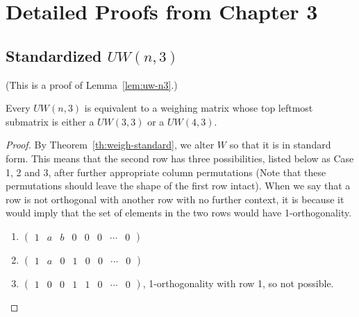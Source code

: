 \chapter[Detailed Proofs from Chapter 3]{Detailed Proofs from Chapter 3}
\label{app:ch3-cases}

\section[Standardized \texorpdfstring{$UW(n,3)$}{UW(n,3)}]{Standardized \texorpdfstring{$UW(n,3)$}{UW(n,3)}}
\label{app:uw-n3}

(This is a proof of Lemma~\ref{lem:uw-n3}.)

\begin{lemma} \label{lem-proof:uw-n3}
 Every $UW(n,3)$ is equivalent to a weighing matrix whose top leftmost submatrix is either a $UW(3,3)$ or a $UW(4,3)$.

\begin{proof}
 By Theorem~\ref{th:weigh-standard}, we alter $W$ so that it is in standard form. This means that the second row has three possibilities, listed below as Case 1, 2 and 3, after further appropriate column permutations (Note that these permutations should leave the shape of the first row intact). When we say that a row is not orthogonal with another row with no further context, it is because it would imply that the set of elements in the two rows would have 1-orthogonality.

   \begin{enumerate}
    \item $
      \left(
       \begin{array}{cccccccc}
         1 & a  & b &0 &0&0 &\dotsb &0
       \end{array}
      \right)
      $
    \item $
      \left(
       \begin{array}{cccccccc}
         1 & a  & 0 &1 &0 &0 &\dotsb &0
       \end{array}
      \right)
      $
    \item $
      \left(
       \begin{array}{cccccccc}
         1 & 0  & 0 &1 &1 &0&\dotsb &0
       \end{array}
      \right)
      $, 1-orthogonality with row 1, so not possible.
   \end{enumerate}

\begin{myind}{1cm}


\end{myind}
\end{proof}
\end{lemma}
